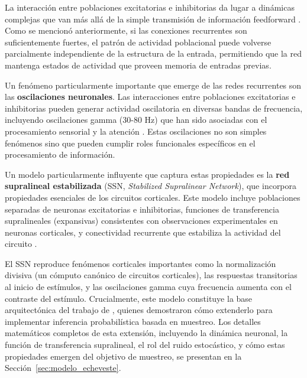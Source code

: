 La interacción entre poblaciones excitatorias e inhibitorias da lugar a dinámicas complejas que van más allá de la simple transmisión de información feedforward \citep{dayan2005theoretical}. Como se mencionó anteriormente, si las conexiones recurrentes son suficientemente fuertes, el patrón de actividad poblacional puede volverse parcialmente independiente de la estructura de la entrada, permitiendo que la red mantenga estados de actividad que proveen memoria de entradas previas.

Un fenómeno particularmente importante que emerge de las redes recurrentes son las \textbf{oscilaciones neuronales}. Las interacciones entre poblaciones excitatorias e inhibitorias pueden generar actividad oscilatoria en diversas bandas de frecuencia, incluyendo oscilaciones gamma (30-80 Hz) que han sido asociadas con el procesamiento sensorial y la atención \citep{echeveste2020cortical}. Estas oscilaciones no son simples fenómenos sino que pueden cumplir roles funcionales específicos en el procesamiento de información.

Un modelo particularmente influyente que captura estas propiedades es la \textbf{red supralineal estabilizada} (\acrshort{SSN}, \textit{Stabilized Supralinear Network}), que incorpora propiedades esenciales de los circuitos corticales. Este modelo incluye poblaciones separadas de neuronas excitatorias e inhibitorias, funciones de transferencia supralineales (expansivas) consistentes con observaciones experimentales en neuronas corticales, y conectividad recurrente que estabiliza la actividad del circuito \citep{echeveste2020cortical}.

El SSN reproduce fenómenos corticales importantes como la normalización divisiva (un cómputo canónico de circuitos corticales), las respuestas transitorias al inicio de estímulos, y las oscilaciones gamma cuya frecuencia aumenta con el contraste del estímulo. Crucialmente, este modelo constituye la base arquitectónica del trabajo de \cite{echeveste2020cortical}, quienes demostraron cómo extenderlo para implementar inferencia probabilística basada en muestreo. Los detalles matemáticos completos de esta extensión, incluyendo la dinámica neuronal, la función de transferencia supralineal, el rol del ruido estocástico, y cómo estas propiedades emergen del objetivo de muestreo, se presentan en la Sección~\ref{sec:modelo_echeveste}.


